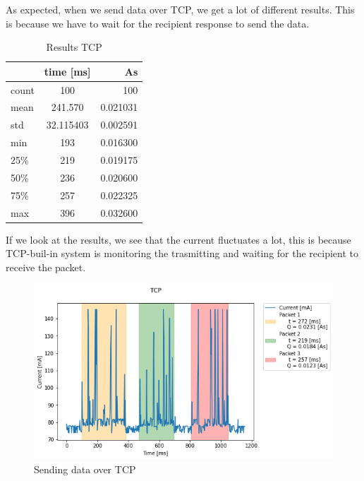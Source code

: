 \newline\newline
As expected, when we send data over TCP, we get a lot of different results.
This is because we have to wait for the recipient response to send the data.
\linebreak\linebreak
\begin{table}[htbp]
\begin{center}
\caption{Results TCP}
\label{tab:table1}
\renewcommand{\arraystretch}{1.8}
\begin{tabular}{l|c|r}
& \textbf{time [ms]} & \textbf{As}\\
\hline
count & 100 & 100\\
mean & 241.570 & 0.021031\\
std & 32.115403 & 0.002591\\
min & 193 & 0.016300\\
25\%  & 219 & 0.019175\\
50\% & 236 & 0.020600\\
75\%  & 257 & 0.022325\\
max & 396 & 0.032600\\
\end{tabular}
\end{center}
\end{table}
\linebreak
If we look at the results, we see that the current fluctuates a lot,
this is because TCP-buil-in system is monitoring the trasmitting 
and waiting for the recipient to receive the packet.\linebreak\linebreak
\begin{figure}[h!]
\centering
\includegraphics[width = 1 \linewidth]{fig/udp_tcp/tcp_s_m.png}
\caption{Sending data over TCP}
\label{fig:tcp_s_m}
\end{figure}
